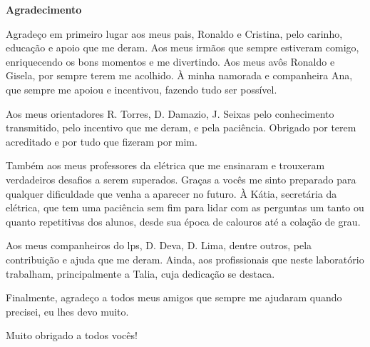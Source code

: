 \cleardoublepage

\begin{center}
\textbf{\Large Agradecimento}
\end{center}

Agradeço em primeiro lugar aos meus pais, Ronaldo e Cristina, 
pelo carinho, educação e apoio que me deram. Aos meus irmãos que sempre
estiveram comigo, enriquecendo os bons momentos e me divertindo. Aos meus 
avôs Ronaldo e Gisela, por sempre terem me acolhido. À minha namorada e 
companheira Ana, que sempre me apoiou e incentivou, fazendo tudo ser possível.

Aos meus orientadores R. Torres, D. Damazio, J. Seixas pelo conhecimento
transmitido, pelo incentivo que me deram, e pela paciência. Obrigado 
por terem acreditado e por tudo que fizeram por mim.

Também aos meus professores da elétrica que me ensinaram e trouxeram 
verdadeiros desafios a serem superados. Graças a vocês me sinto preparado para
qualquer dificuldade que venha a aparecer no futuro.
À Kátia, secretária da elétrica, que tem uma paciência sem fim para lidar com as
perguntas um tanto ou quanto repetitivas dos alunos, desde sua época de calouros
até a colação de grau. 


Aos meus companheiros do \acrshort{lps}, D. Deva, D. Lima, 
dentre outros, pela contribuição e ajuda que me deram. Ainda, aos profissionais que neste 
laboratório trabalham, principalmente a Talia, cuja dedicação se destaca.

Finalmente, agradeço a todos meus amigos que sempre me ajudaram quando precisei, 
eu lhes devo muito.

Muito obrigado a todos vocês!
